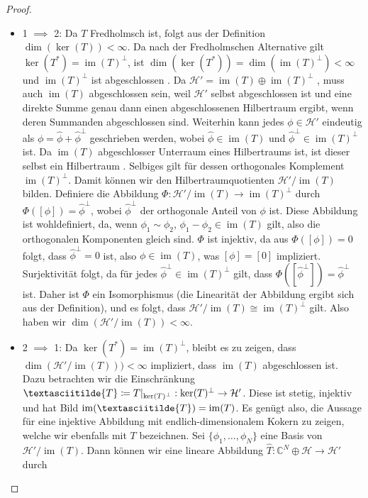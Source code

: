 \documentclass[11pt, hidelinks]{article}
\newcommand{\h}{\mathcal{H}}
\newcommand{\im}{\operatorname{im}}
\numberwithin{conj}{section}
\begin{document}
\begin{proof}\noindent
\begin{itemize}
    \item 1 $\implies$ 2: Da $T$ Fredholmsch ist, folgt aus der Definition $\dim(\ker(T)) < \infty$. Da nach der Fredholmschen Alternative \cite[Satz 5.9]{lechner} gilt $\ker(T^\ast) = \im(T)^\perp$, ist $\dim(\ker(T^\ast)) = \dim(\im(T)^\perp) < \infty$ und $\im(T)^\perp$ ist abgeschlossen \cite[Lemma 2.4]{lechner}. Da \( \h' = \im(T) \oplus \im(T)^\perp \)  \cite[Satz 2.16, Projektionstheorem]{lechner}, muss auch $\im(T)$ abgeschlossen sein, weil $\h'$ selbst abgeschlossen ist und eine direkte Summe genau dann einen abgeschlossenen Hilbertraum ergibt, wenn deren Summanden abgeschlossen sind. Weiterhin kann jedes \( \phi \in \h' \) eindeutig als \( \phi = \hat{\phi} + \hat{\phi}^\perp \) geschrieben werden, wobei \( \hat{\phi} \in \im(T) \) und \( \hat{\phi}^\perp \in \im(T)^\perp \) ist. Da $\im(T)$ abgeschlosser Unterraum eines Hilbertraums ist, ist dieser selbst ein Hilbertraum \cite[Satz 4.7]{werner2018funktionalanalysis}. Selbiges gilt für dessen orthogonales Komplement $\im(T)^\perp$. Damit können wir den Hilbertraumquotienten $\h' / \im(T)$ bilden. Definiere die Abbildung \( \Phi: \h' / \im(T) \to \im(T)^\perp \) durch \( \Phi([\phi]) = \hat{\phi}^\perp \), wobei \( \hat{\phi}^\perp \) der orthogonale Anteil von \( \phi \) ist. Diese Abbildung ist wohldefiniert, da, wenn \( \phi_1 \sim \phi_2 \), \( \phi_1 - \phi_2 \in \im(T) \) gilt, also die orthogonalen Komponenten gleich sind. \( \Phi \) ist injektiv, da aus \( \Phi([\phi]) = 0 \) folgt, dass \( \hat{\phi}^\perp = 0 \) ist, also \( \phi \in \im(T) \), was \( [\phi] = [0] \) impliziert. Surjektivität folgt, da für jedes \( \hat{\phi}^\perp \in \im(T)^\perp \) gilt, dass \( \Phi([\hat{\phi}^\perp]) = \hat{\phi}^\perp \) ist. Daher ist \( \Phi \) ein Isomorphismus (die Linearität der Abbildung ergibt sich aus der Definition), und es folgt, dass \( \h' / \im(T) \cong \im(T)^\perp \) gilt. Also haben wir $\dim(\h'/\im(T)) < \infty$.
    \item 2 $\implies$ 1: Da $\ker(T^\ast) = \im(T)^\perp$, bleibt es zu zeigen, dass $\dim(\h'/\im(T))) < \infty$ impliziert, dass $\im(T)$ abgeschlossen ist. Dazu betrachten wir die Einschränkung $\textasciitilde{T} \coloneq T\vert_{\ker(T)^\perp}: \ker(T)^\perp \rightarrow \h'$. Diese ist stetig, injektiv und hat Bild $\im(\textasciitilde{T}) = \im(T)$. Es genügt also, die Aussage für eine injektive Abbildung mit endlich-dimensionalem Kokern zu zeigen, welche wir ebenfalls mit $T$ bezeichnen. Sei $\{\phi_1, \ldots, \phi_N\}$ eine Basis von $\h'/\im(T)$. Dann können wir eine lineare Abbildung $\hat{T}: \mathbb{C}^N \oplus \h \to \h'$ durch

\end{itemize}
\end{proof}
\end{document}

